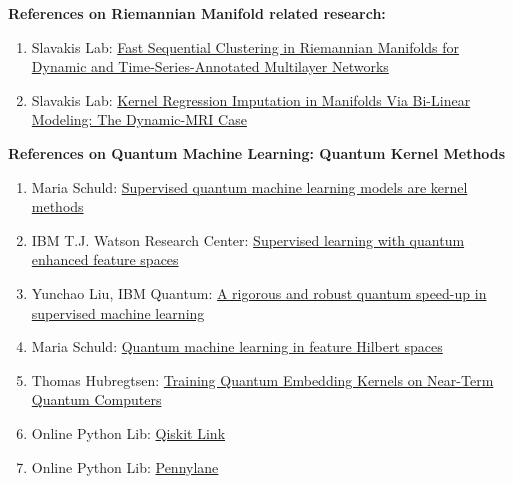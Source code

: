 \documentclass{article}
\begin{document}



  


\textbf{References on Riemannian Manifold related research:}
\begin{enumerate}
  \item Slavakis Lab: \href{https://ieeexplore.ieee.org/document/9321498}{Fast Sequential Clustering in Riemannian Manifolds 
  for Dynamic and Time-Series-Annotated Multilayer Networks}
  \item Slavakis Lab: \href{https://ieeexplore.ieee.org/document/9699419}{Kernel Regression Imputation in Manifolds Via Bi-Linear Modeling: 
  The Dynamic-MRI Case}
\end{enumerate}

\textbf{References on Quantum Machine Learning: Quantum Kernel Methods}
\begin{enumerate}
  \item Maria Schuld: \href{https://arxiv.org/abs/2101.11020}{Supervised quantum machine learning models are kernel methods}
  \item IBM T.J. Watson Research Center: \href{https://arxiv.org/abs/1804.11326}{Supervised learning with quantum enhanced feature spaces}
  \item Yunchao Liu, IBM Quantum: \href{https://arxiv.org/abs/2010.02174}{A rigorous and robust quantum speed-up in supervised machine learning}
  \item Maria Schuld: \href{https://arxiv.org/abs/1803.07128}{Quantum machine learning in feature Hilbert spaces}
  \item Thomas Hubregtsen: \href{https://arxiv.org/abs/2105.02276}{Training Quantum Embedding Kernels on Near-Term Quantum Computers}
  \item Online Python Lib: \href{https://qiskit.org/documentation/machine-learning/tutorials/03_quantum_kernel.html
  }{Qiskit Link}
  \item Online Python Lib: \href{https://pennylane.ai/qml/demos/tutorial_kernel_based_training.html}{Pennylane}
\end{enumerate}
\end{document}

